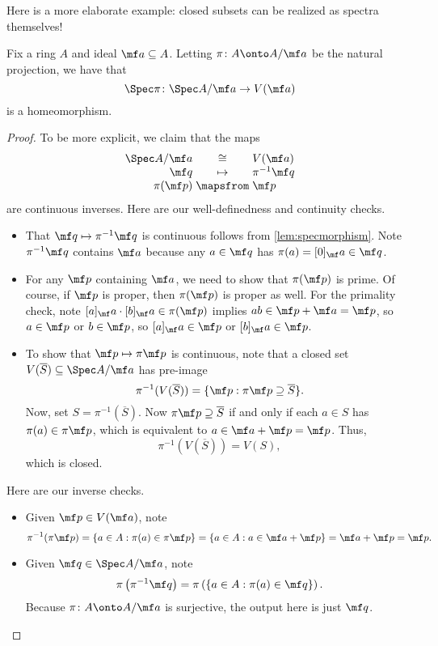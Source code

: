 \documentclass[../notes.tex]{subfiles}
\begin{document}
Here is a more elaborate example: closed subsets can be realized as spectra themselves!
\begin{exe} \label{exe:closedaffinesubscheme}
	Fix a ring $A$ and ideal $\mf a\subseteq A$. Letting $\pi\colon A\onto A/\mf a$ be the natural projection, we have that
	\[{\Spec\pi}\colon\Spec A/\mf a\to V(\mf a)\]
	is a homeomorphism.
\end{exe}
\begin{proof}
	To be more explicit, we claim that the maps
	\[\arraycolsep=1.4pt\begin{array}{rcl}
		\Spec A/\mf a &\cong& V(\mf a) \\
		\mf q &\mapsto& \pi^{-1}\mf q \\
		\pi(\mf p) &\mapsfrom& \mf p
	\end{array}\]
	are continuous inverses. Here are our well-definedness and continuity checks.
	\begin{itemize}
		\item That $\mf q\mapsto\pi^{-1}\mf q$ is continuous follows from \autoref{lem:specmorphism}. Note $\pi^{-1}\mf q$ contains $\mf a$ because any $a\in\mf q$ has $\pi(a)=[0]_\mf a\in\mf q$.
		\item For any $\mf p$ containing $\mf a$, we need to show that $\pi(\mf p)$ is prime. Of course, if $\mf p$ is proper, then $\pi(\mf p)$ is proper as well. For the primality check, note $[a]_\mf a\cdot[b]_\mf a\in\pi(\mf p)$ implies $ab\in\mf p+\mf a=\mf p$, so $a\in\mf p$ or $b\in\mf p$, so $[a]_\mf a\in\mf p$ or $[b]_\mf a\in\mf p$.
		\item To show that $\mf p\mapsto\pi\mf p$ is continuous, note that a closed set $V(\overline S)\subseteq\Spec A/\mf a$ has pre-image
		\[\pi^{-1}(V(\overline S))=\{\mf p:\pi\mf p\supseteq\overline S\}.\]
		Now, set $S=\pi^{-1}(\overline S)$. Now $\pi\mf p\supseteq\overline S$ if and only if each $a\in S$ has $\pi(a)\in\pi\mf p$, which is equivalent to $a\in\mf a+\mf p=\mf p$. Thus,
		\[\pi^{-1}(V(\overline S))=V(S),\]
		which is closed.
	\end{itemize}
	Here are our inverse checks.
	\begin{itemize}
		\item Given $\mf p\in V(\mf a)$, note
		\[\pi^{-1}(\pi\mf p)=\{a\in A:\pi(a)\in\pi\mf p\}=\{a\in A:a\in\mf a+\mf p\}=\mf a+\mf p=\mf p.\]
		\item Given $\mf q\in\Spec A/\mf a$, note
		\[\pi\left(\pi^{-1}\mf q\right)=\pi\left(\{a\in A:\pi(a)\in\mf q\}\right).\]
		Because $\pi\colon A\onto A/\mf a$ is surjective, the output here is just $\mf q$.
		\qedhere
	\end{itemize}
\end{proof}
\end{document}
